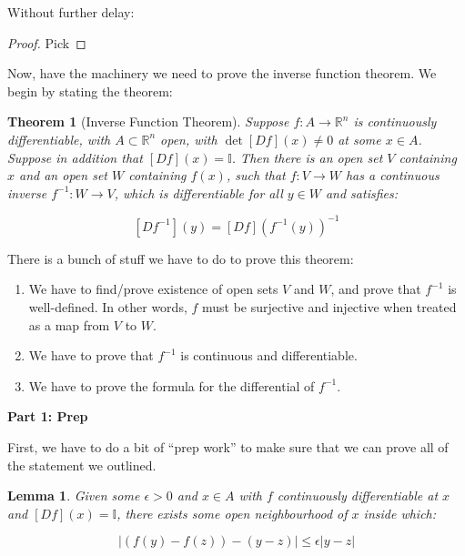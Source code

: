\documentclass[10pt, oneside]{amsart}
\newtheorem{thm}{Theorem}
\newtheorem{lem}{Lemma}
\begin{document}
    Without further delay:

    \begin{proof}
      Pick 
    \end{proof}

    Now, have the machinery we need to prove the inverse function theorem. We begin by stating the theorem:

    \begin{thm}[Inverse Function Theorem]
      Suppose $f : A \rightarrow \mathbb{R}^{n}$ is continuously differentiable, with $A \subset \mathbb{R}^{n}$ open, with $\det [D f](x) \neq 0$ at some $x \in A$. Suppose in addition that $[Df](x) = \mathbb{I}$.
      Then there is an open set $V$ containing $x$ and an open set $W$ containing $f(x)$, such that
      $f : V \rightarrow W$ has a continuous inverse $f^{-1} : W \rightarrow V$, which is differentiable for all $y \in W$ and satisfies:

      $$[D f^{-1}](y) = [D f](f^{-1}(y))^{-1}$$
    \end{thm}

    There is a bunch of stuff we have to do to prove this theorem:

      \begin{enumerate}
      \item We have to find/prove existence of open sets $V$ and $W$, and prove that $f^{-1}$ is well-defined. In other words, $f$ must be surjective and injective when treated as a map from $V$ to $W$.
      \item We have to prove that $f^{-1}$ is continuous and differentiable.
      \item We have to prove the formula for the differential of $f^{-1}$.
      \end{enumerate}

    \textbf{Part 1: Prep}
    \newline

    First, we have to do a bit of ``prep work'' to make sure that we can prove all of the statement we outlined.
    \newline

    \begin{lem}
      Given some $\epsilon > 0$ and $x \in A$ with $f$ continuously differentiable at $x$ and $[Df](x) = \mathbb{I}$, there exists some open neighbourhood of $x$ inside which:

      $$| (f(y) - f(z)) - (y - z) | \leq \epsilon |y - z|$$
    \end{lem}
\end{document}
